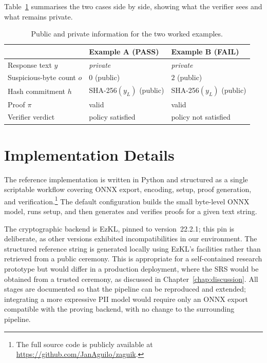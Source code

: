 \medskip

Table~\ref{tab:worked-example} summarises the two cases side by side, showing what the verifier sees and what remains private.

\begin{table}[htbp]
\centering
\caption{Public and private information for the two worked examples.}
\label{tab:worked-example}
\footnotesize
\begin{tabular}{l l l}
\hline
\hline
 & Example A (PASS) & Example B (FAIL) \\
\hline
Response text $y$ & \emph{private} & \emph{private} \\
Suspicious-byte count $o$ & $0$ (public) & $2$ (public) \\
Hash commitment $h$ & SHA-256$(y_L)$ (public) & SHA-256$(y_L)$ (public) \\
Proof $\pi$ & valid & valid \\
Verifier verdict & policy satisfied & policy not satisfied \\
\hline
\hline
\end{tabular}
\end{table}

\section{Implementation Details}
\label{sec:sd-implementation}

The reference implementation is written in Python and structured as a single scriptable workflow covering ONNX export, encoding, setup, proof generation, and verification.\footnote{The full source code is publicly available at \url{https://github.com/JanAguilo/zaguik}.} The default configuration builds the small byte-level ONNX model, runs setup, and then generates and verifies proofs for a given text string.

\medskip

The cryptographic backend is EzKL, pinned to version~22.2.1; this pin is deliberate, as other versions exhibited incompatibilities in our environment. The structured reference string is generated locally using EzKL's facilities rather than retrieved from a public ceremony. This is appropriate for a self-contained research prototype but would differ in a production deployment, where the SRS would be obtained from a trusted ceremony, as discussed in Chapter~\ref{chap:discussion}. All stages are documented so that the pipeline can be reproduced and extended; integrating a more expressive PII model would require only an ONNX export compatible with the proving backend, with no change to the surrounding pipeline.
